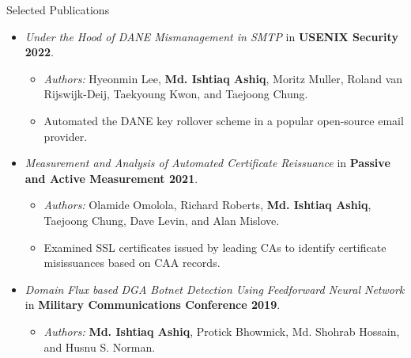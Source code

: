 \documentclass[]{mcdowellcv}
\begin{document}
\begin{cvsection}{Selected Publications}
\begin{cvsubsection}{}{}{}
\begin{itemize}
\begin{itemize}
				\end{itemize}
				\item \textit{Under the Hood of DANE Mismanagement in SMTP} in \textbf{USENIX Security 2022}.
				\begin{itemize}
					\item \textit{Authors:} Hyeonmin Lee, \textbf{Md. Ishtiaq Ashiq}, Moritz Muller, Roland van Rijswijk-Deij, Taekyoung Kwon, and Taejoong Chung.
					\item Automated the DANE key rollover scheme in a popular open-source email provider.
				\end{itemize}
				\item \textit{Measurement and Analysis of Automated Certificate Reissuance} in \textbf{Passive and Active Measurement 2021}.
				\begin{itemize}
					\item \textit{Authors:} Olamide Omolola, Richard Roberts, \textbf{Md. Ishtiaq Ashiq}, Taejoong Chung, Dave Levin, and Alan Mislove.  %
					\item Examined SSL certificates issued by leading CAs to identify certificate misissuances based on CAA records.
				\end{itemize}
				\item \textit{Domain Flux based DGA Botnet Detection Using Feedforward Neural Network} in \textbf{Military Communications Conference 2019}.
				\begin{itemize}
					\item \textit{Authors:} \textbf{Md. Ishtiaq Ashiq}, Protick Bhowmick, Md. Shohrab Hossain, and Husnu S. Norman.  %
				\end{itemize}
			\end{itemize}
		\end{cvsubsection}
	\end{cvsection}
\end{document}
